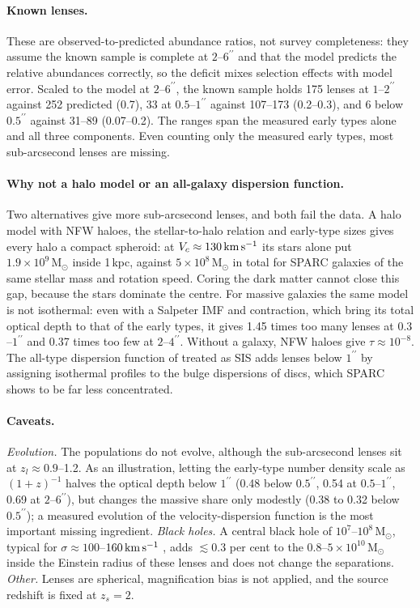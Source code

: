 \documentclass[11pt,a4paper]{article}
\newcommand{\msun}{\mathrm{M}_\odot}
\newcommand{\arcsecond}{^{\prime\prime}}
\newcommand{\kms}{\,{\rm km\,s^{-1}}}
\begin{document}
\paragraph{Known lenses.} These are observed-to-predicted abundance ratios, not survey completeness: they assume the known sample is complete at $2$--$6\arcsecond$ and that the model predicts the relative abundances correctly, so the deficit mixes selection effects with model error. Scaled to the model at $2$--$6\arcsecond$, the known sample holds 175 lenses at $1$--$2\arcsecond$ against 252 predicted (0.7), 33 at $0.5$--$1\arcsecond$ against 107--173 (0.2--0.3), and 6 below $0.5\arcsecond$ against 31--89 (0.07--0.2). The ranges span the measured early types alone and all three components. Even counting only the measured early types, most sub-arcsecond lenses are missing.

\paragraph{Why not a halo model or an all-galaxy dispersion function.} Two alternatives give more sub-arcsecond lenses, and both fail the data. A halo model with NFW haloes, the \citet{Moster2013} stellar-to-halo relation and early-type sizes \citep{vanderWel2014} gives every halo a compact spheroid: at $V_c\approx130\kms$ its stars alone put $1.9\times10^9\,\msun$ inside 1\,kpc, against $5\times10^8\,\msun$ in total for SPARC galaxies of the same stellar mass and rotation speed. Coring the dark matter cannot close this gap, because the stars dominate the centre. For massive galaxies the same model is not isothermal: even with a Salpeter IMF and \citet{Cautun2020} contraction, which bring its total optical depth to that of the early types, it gives 1.45 times too many lenses at $0.3$--$1\arcsecond$ and 0.37 times too few at $2$--$4\arcsecond$. Without a galaxy, NFW haloes give $\tau\approx10^{-8}$. The all-type dispersion function of \citet{Bernardi2010} treated as SIS adds lenses below $1\arcsecond$ by assigning isothermal profiles to the bulge dispersions of discs, which SPARC shows to be far less concentrated.

\paragraph{Caveats.} \emph{Evolution.} The populations do not evolve, although the sub-arcsecond lenses sit at $z_l\approx0.9$--1.2. As an illustration, letting the early-type number density scale as $(1+z)^{-1}$ halves the optical depth below $1\arcsecond$ (0.48 below $0.5\arcsecond$, 0.54 at $0.5$--$1\arcsecond$, 0.69 at $2$--$6\arcsecond$), but changes the massive share only modestly (0.38 to 0.32 below $0.5\arcsecond$); a measured evolution of the velocity-dispersion function is the most important missing ingredient. \emph{Black holes.} A central black hole of $10^7$--$10^8\,\msun$, typical for $\sigma\approx100$--$160\kms$ \citep{Kormendy2013}, adds $\lesssim0.3$ per cent to the 0.8--$5\times10^{10}\,\msun$ inside the Einstein radius of these lenses and does not change the separations. \emph{Other.} Lenses are spherical, magnification bias is not applied, and the source redshift is fixed at $z_s=2$.
\end{document}
